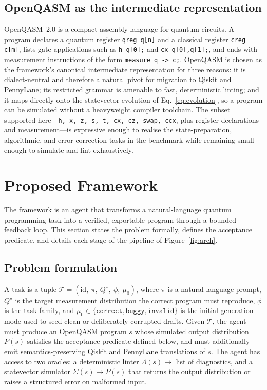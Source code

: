 \documentclass[11pt,a4paper]{article}
\newcounter{algo}
\begin{document}
\subsection{OpenQASM as the intermediate representation}
OpenQASM~2.0 is a compact assembly language for quantum circuits. A program declares a quantum register \texttt{qreg q[n]} and a classical register \texttt{creg c[m]}, lists gate applications such as \texttt{h q[0];} and \texttt{cx q[0],q[1];}, and ends with measurement instructions of the form \texttt{measure q -> c;}. OpenQASM is chosen as the framework's canonical intermediate representation for three reasons: it is dialect-neutral and therefore a natural pivot for migration to Qiskit and PennyLane; its restricted grammar is amenable to fast, deterministic linting; and it maps directly onto the statevector evolution of Eq.~\eqref{eq:evolution}, so a program can be simulated without a heavyweight compiler toolchain. The subset supported here---\texttt{h, x, z, s, t, cx, cz, swap, ccx}, plus register declarations and measurement---is expressive enough to realise the state-preparation, algorithmic, and error-correction tasks in the benchmark while remaining small enough to simulate and lint exhaustively.

\section{Proposed Framework}
\label{sec:method}

The framework is an agent that transforms a natural-language quantum programming task into a verified, exportable program through a bounded feedback loop. This section states the problem formally, defines the acceptance predicate, and details each stage of the pipeline of Figure~\ref{fig:arch}.

\subsection{Problem formulation}
A task is a tuple $\mathcal{T}=(\text{id},\ \pi,\ Q^{\star},\ \phi,\ \mu_0)$, where $\pi$ is a natural-language prompt, $Q^{\star}$ is the target measurement distribution the correct program must reproduce, $\phi$ is the task family, and $\mu_0\in\{\texttt{correct},\texttt{buggy},\texttt{invalid}\}$ is the initial generation mode used to seed clean or deliberately corrupted drafts. Given $\mathcal{T}$, the agent must produce an OpenQASM program $s$ whose simulated output distribution $P(s)$ satisfies the acceptance predicate defined below, and must additionally emit semantics-preserving Qiskit and PennyLane translations of $s$. The agent has access to two oracles: a deterministic linter $\Lambda(s)\rightarrow$ list of diagnostics, and a statevector simulator $\Sigma(s)\rightarrow P(s)$ that returns the output distribution or raises a structured error on malformed input.
\end{document}
